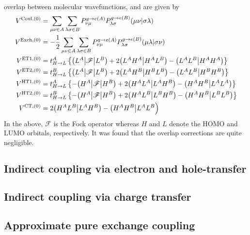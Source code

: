 overlap between molecular wavefunctions, and are given by
%
\begin{align}
 V^{{\rm Coul},(0)} &= \sum_{\mu\nu\in A} \sum_{\lambda\sigma\in B} 
  P_{\nu\mu}^{g\rightarrow e(A)} P_{\lambda\sigma}^{g\rightarrow e(B)} 
  (\mu\nu | \sigma\lambda) \\
 V^{{\rm Exch},(0)} &=-\frac{1}{2} \sum_{\mu\nu\in A} \sum_{\lambda\sigma\in B} 
  P_{\nu\mu}^{g\rightarrow e(A)} P_{\lambda\sigma}^{g\rightarrow e(B)} 
  (\mu\lambda | \sigma\nu) \\
 V^{{\rm ET1},(0)} &= t_{H\rightarrow L}^A \left\{ \big( L^A \big| \mathscr{F} \big| L^B \big) 
   + 2 \big( L^A H^A \big| H^A L^B \big) - \big( L^A L^B \big| H^A H^A \big)  \right\} \\
 V^{{\rm ET2},(0)} &= t_{H\rightarrow L}^B \left\{ \big( L^A \big| \mathscr{F} \big| L^B \big) 
   + 2 \big( L^A H^B \big| H^B L^B \big) - \big( L^A L^B \big| H^B H^B \big)  \right\} \\
 V^{{\rm HT1},(0)} &= t_{H\rightarrow L}^A \left\{-\big( H^A \big| \mathscr{F} \big| H^B \big) 
   + 2 \big( H^A L^A \big| L^A H^B \big) - \big( H^A H^B \big| L^A L^A \big)  \right\} \\
 V^{{\rm HT2},(0)} &= t_{H\rightarrow L}^B \left\{-\big( H^A \big| \mathscr{F} \big| H^B \big) 
   + 2 \big( H^A L^B \big| L^B H^B \big) - \big( H^A H^B \big| L^B L^B \big)  \right\} \\
 V^{{\rm CT },(0)} &= 
     2 \big( H^A L^B \big| L^A H^B \big) - \big( H^A H^B \big| L^A L^B \Big) 
\end{align}
%
In the above, $\mathscr{F}$ is the Fock operator whereas $H$ and $L$ denote the 
HOMO and LUMO orbitals, respectively. It was found that the overlap corrections
are quite negligible.


\subsection{\label{s:2.1}Indirect coupling via electron and hole-transfer}

\subsection{\label{s:2.2}Indirect coupling via charge transfer}

\subsection{\label{s:2.3}Approximate pure exchange coupling}

